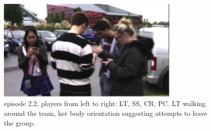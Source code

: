\begin{figure}[ht]
 \includegraphics[width=0.8\textwidth]{img/study2/ep2/ep21}
\caption{episode 2.2, players from left to right: LT, SS, CR, PC. LT  walking around the team, her body orientation suggesting attempts to leave the group.}
\label{fig:study2ep21}
\end{figure}

